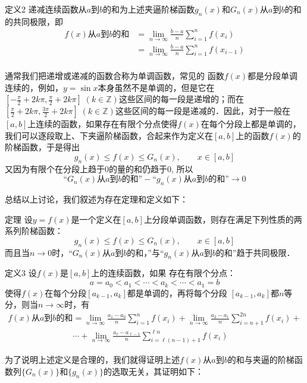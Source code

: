 \begin{blk}
    {定义2} 递减连续函数从$a$到$b$的和为上述夹逼阶梯函数$g_n(x)$和$G_n(x)$从$a$到$b$的和的共同极限，即  
\begin{align*}
    f(x)\text{从$a$到$b$的和}&=\lim_{n\to\infty} \frac{b-a}{n}\sum^n_{i=1}f(x_i)\\
    &=\lim_{n\to\infty} \frac{b-a}{n}\sum^n_{i=1}f(x_{i-1})\\
\end{align*}
\end{blk}

通常我们把递增或递减的函数合称为单调函数，常见的
函数$f(x)$都是分段单调连续的，例如，$y=\sin x$本身虽然不是单调的，但是它在$\left[-\frac{\pi}{2}+2k\pi,\frac{\pi}{2}+2k\pi\right]\; (k\in\mathbb{Z})$这些区间的每一段是递增的；而在$\left[\frac{\pi}{2}+2k\pi,\frac{3\pi}{2}+2k\pi\right]\; (k\in\mathbb{Z})$这些区间的每一段是递减的．因此，对于一般在$[a,b]$上连续的函数，如果存在有限个分点使得$f(x)$在每个分段上都是单调的，我们可以逐段取上、下夹逼阶梯函数，合起来作为定义在$[a,b]$上的函数$f(x)$的阶梯函数，于是得出
\[g_n (x)\le f(x)\le G_n(x),\qquad x\in [a,b]\]
又因为有限个在分段上趋于0的量的和仍趋于0, 所以
\[\text{“$G_n(x)$从$a$到$b$的和”}-\text{“$g_n(x)$从$a$到$b$的和”}\to 0\]

总结以上讨论，我们叙述为存在定理和定义如下：

\begin{blk}
    {定理} 设$y=f(x)$是一个定义在$[a,b]$上分段单调函数，则存在满足下列性质的两系列阶梯函数：
    \[g_n(x)\le f(x)\le G_n(x),\qquad x\in[a,b]\]
而且当$n\to 0$时，“$G_n(x)$从$a$到$b$的和，”与“$g_n(x)$从$a$到$b$的和”趋于共同极限．
\end{blk}


\begin{blk}
    {定义3} 设$f(x)$是$[a,b]$上的连续函数，如果 存在有限个分点：
\[a=a_0<a_1<\cdots<a_k<\cdots<a_1=b\]
使得$f(x)$在每个分段$[a_{k-1},a_k]$都是单调的，再将每个分段
    $[a_{k-1},a_k]$都$n$等分，则当$n\to\infty$时，有
\begin{align*}
f(x)\text{从$a$到$b$的和}&=\lim_{n\to\infty}\frac{a_1-a_0}{n}\sum^n_{i=1}f(x_i)+\lim_{n\to\infty}\frac{a_2-a_1}{n}\sum^{2n}_{i=n+1}f(x_i)+\\
&\cdots +\lim_{n\to\infty}\frac{a_\ell-a_{\ell-1}}{n}\sum^{\ell n}_{i=\ell(n-1)+1}f(x_i)
\end{align*}
\end{blk}

为了说明上述定义是合理的，我们就得证明上述$f(x)$从$a$到$b$的和与夹逼的阶梯函数列$\{G_n(x)\}$和$\{g_n(x)\}$的选取无关，其证明如下：

